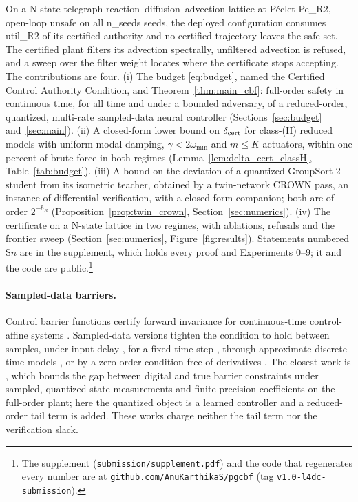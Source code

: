 On a {{N}}-state telegraph reaction--diffusion--advection lattice at P\'eclet {{Pe_R2}}, open-loop unsafe on all {{n_seeds}} seeds, the deployed configuration consumes {{util_R2}} of its certified authority and no certified trajectory leaves the safe set. The certified plant filters its advection spectrally, unfiltered advection is refused, and a sweep over the filter weight locates where the certificate stops accepting. The contributions are four. (i) The budget \eqref{eq:budget}, named the Certified Control Authority Condition, and Theorem~\ref{thm:main_cbf}: full-order safety in continuous time, for all time and under a bounded adversary, of a reduced-order, quantized, multi-rate sampled-data neural controller (Sections~\ref{sec:budget} and~\ref{sec:main}). (ii) A closed-form lower bound on $\delta_{\mathrm{cert}}$ for class-(H) reduced models with uniform modal damping, $\gamma < 2\omega_{\min}$ and $m \le K$ actuators, within one percent of brute force in both regimes (Lemma~\ref{lem:delta_cert_classH}, Table~\ref{tab:budget}). (iii) A bound on the deviation of a quantized GroupSort-2 student from its isometric teacher, obtained by a twin-network CROWN pass, an instance of differential verification, with a closed-form companion; both are of order $2^{-b_B}$ (Proposition~\ref{prop:twin_crown}, Section~\ref{sec:numerics}). (iv) The certificate on a {{N}}-state lattice in two regimes, with ablations, refusals and the frontier sweep (Section~\ref{sec:numerics}, Figure~\ref{fig:results}). Statements numbered S$n$ are in the supplement, which holds every proof and Experiments 0--9; it and the code are public.\footnote{The supplement (\href{https://github.com/AnuKarthikaS/pgcbf/blob/v1.0-l4dc-submission/submission/supplement.pdf}{\texttt{submission/supplement.pdf}}) and the code that regenerates every number are at \href{https://github.com/AnuKarthikaS/pgcbf}{\texttt{github.com/AnuKarthikaS/pgcbf}} (tag \texttt{v1.0-l4dc-submission}).}

\paragraph{Sampled-data barriers.}
Control barrier functions certify forward invariance for continuous-time control-affine systems \citep{ames2017cbf,ames2019theory}. Sampled-data versions tighten the condition to hold between samples, under input delay \citep{singletary2020sampled}, for a fixed time step \citep{breeden2022sampled}, through approximate discrete-time models \citep{taylor2022sampled}, or by a zero-order condition free of derivatives \citep{tan2025zeroorder}. The closest work is \citet{niu2024sampling}, which bounds the gap between digital and true barrier constraints under sampled, quantized state measurements and finite-precision coefficients on the full-order plant; here the quantized object is a learned controller and a reduced-order tail term is added. These works charge neither the tail term nor the verification slack.

